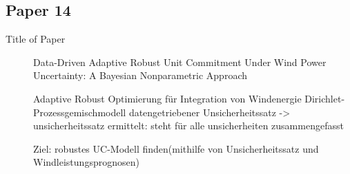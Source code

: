 \documentclass[a4paper,oneside,12pt,titlepage]{scrartcl}   %
\begin{document}
	\subsection{Paper 14}
	\label{subsec:paper14}
	
	\begin{description}
		
	\item[Title of Paper] Data-Driven Adaptive Robust Unit Commitment
	Under Wind Power Uncertainty: A Bayesian
	Nonparametric Approach \cite{8603781}
	
	Adaptive Robust Optimierung
	für Integration von Windenergie
	Dirichlet-Prozessgemischmodell
	datengetriebener Unsicherheitssatz -> unsicherheitssatz ermittelt: steht für alle unsicherheiten zusammengefasst
	
	Ziel: robustes UC-Modell finden(mithilfe von Unsicherheitssatz und Windleistungsprognosen)


\end{description}
\end{document}
